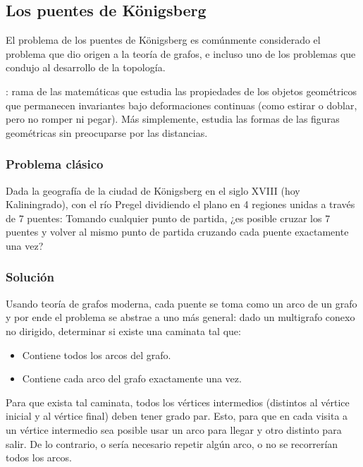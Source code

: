 \subsection{Los puentes de Königsberg}
\label{sec:los_puentes_de_konigsberg}

El problema de los puentes de Königsberg es comúnmente considerado el problema que dio origen a la teoría de grafos, e incluso uno de los problemas que condujo al desarrollo de la topología.

: rama de las matemáticas que estudia las propiedades de los objetos geométricos que permanecen invariantes bajo deformaciones continuas (como estirar o doblar, pero no romper ni pegar). Más simplemente, estudia las formas de las figuras geométricas sin preocuparse por las distancias.

\subsubsection{Problema clásico}
\label{sec:problema_clasico}

Dada la geografía de la ciudad de Königsberg en el siglo XVIII (hoy Kaliningrado), con el río Pregel dividiendo el plano en 4 regiones unidas a través de 7 puentes:
Tomando cualquier punto de partida, ¿es posible cruzar los 7 puentes y volver al mismo punto de partida cruzando cada puente exactamente una vez?

\subsubsection{Solución}
\label{sec:solucion_moderna}

Usando teoría de grafos moderna, cada puente se toma como un arco de un grafo y por ende el problema se abstrae a uno más general: dado un multigrafo conexo no dirigido, determinar si existe una caminata tal que:
\begin{itemize}
  \item Contiene todos los arcos del grafo.
  \item Contiene cada arco del grafo exactamente una vez.
\end{itemize}

Para que exista tal caminata, todos los  vértices intermedios (distintos al vértice inicial y al vértice final) deben tener grado par. Esto, para que en cada visita a un vértice intermedio sea posible usar un arco para llegar y otro distinto para salir. De lo contrario, o sería necesario repetir algún arco, o no se recorrerían todos los arcos.


